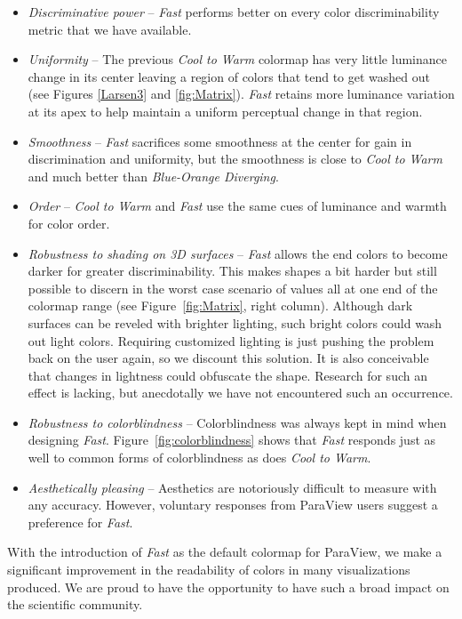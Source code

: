 \documentclass{IEEEcsmag}
\newcommand*{\colormap}[1]{\textsl{#1}\xspace}
\newcommand*{\coolwarm}{\colormap{Cool to Warm}}
\newcommand*{\blueorange}{\colormap{Blue-Orange Diverging}}
\newcommand*{\fast}{\colormap{Fast}}
\begin{document}
\begin{itemize}

\item \emph{Discriminative power} --
  \fast performs better on every color discriminability metric that we have available.
\item \emph{Uniformity} --
  The previous \coolwarm colormap has very little luminance change in its center leaving a region of colors that tend to get washed out (see Figures \ref{Larsen3} and \ref{fig:Matrix}).
  \fast retains more luminance variation at its apex to help maintain a uniform perceptual change in that region.
\item \emph{Smoothness} --
  \fast sacrifices some smoothness at the center for gain in discrimination and uniformity, but the smoothness is close to \coolwarm and much better than \blueorange.
\item \emph{Order} --
  \coolwarm and \fast use the same cues of luminance and warmth for color order.
\item \emph{Robustness to shading on 3D surfaces} --
  \fast allows the end colors to become darker for greater discriminability.
  This makes shapes a bit harder but still possible to discern in the worst case scenario of values all at one end of the colormap range (see Figure~\ref{fig:Matrix}, right column).
  Although dark surfaces can be reveled with brighter lighting, such bright colors could wash out light colors.
  Requiring customized lighting is just pushing the problem back on the user again, so we discount this solution.
  It is also conceivable that changes in lightness could obfuscate the shape.
  Research for such an effect is lacking, but anecdotally we have not encountered such an occurrence.
\item \emph{Robustness to colorblindness} --
  Colorblindness was always kept in mind when designing \fast.
  Figure~\ref{fig:colorblindness} shows that \fast responds just as well to common forms of colorblindness as does \coolwarm.
\item \emph{Aesthetically pleasing} --
  Aesthetics are notoriously difficult to measure with any accuracy.
  However, voluntary responses from ParaView users suggest a preference for \fast.

\end{itemize}



With the introduction of \fast as the default colormap for ParaView, we make a significant improvement in the readability of colors in many visualizations produced. We are proud to have the opportunity to have such a broad impact on the scientific community.
\end{document}
